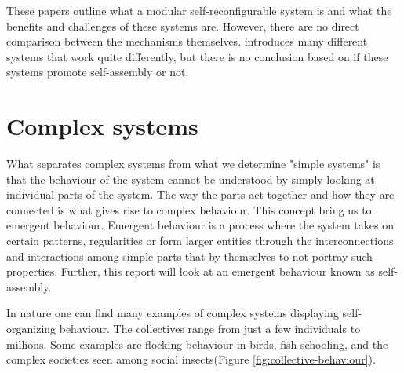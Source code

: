 These papers outline what a modular self-reconfigurable system is and what the benefits and challenges of these systems are.
However, there are no direct comparison between the mechanisms themselves.
\cite{yim_modular_2007} introduces many different systems that work quite differently, but there is no conclusion based on if  these systems promote self-assembly or not.

\section{Complex systems}
\label{sec:complex_systems}
What separates complex systems from what we determine "simple systems" is that the behaviour of the system cannot be understood by simply looking at individual parts of the system.
The way the parts act together and how they are connected is what gives rise to complex behaviour.
This concept bring us to emergent behaviour.
Emergent behaviour is a process where the system takes on certain patterns, regularities or form larger entities through the interconnections and interactions among simple parts that by themselves to not portray such properties.
Further, this report will look at an emergent behaviour known as self-assembly.  

In nature one can find many examples of complex systems displaying self-organizing behaviour.
The collectives range from just a few individuals to millions.
Some examples are flocking behaviour in birds, fish schooling, and the complex societies seen among social insects(Figure \ref{fig:collective-behaviour}). 

